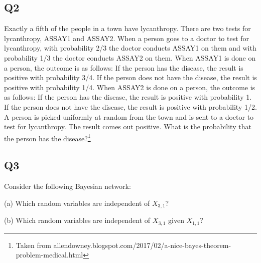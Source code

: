 \documentclass[11pt,a4paper]{scrartcl}
\begin{document}
\subsection*{Q2}
Exactly a fifth of the people in a town have lycanthropy. There
  are two tests for lycanthropy, ASSAY1 and ASSAY2. When a person goes
  to a doctor to test for lycanthropy, with probability 2/3 the doctor
  conducts ASSAY1 on them and with probability 1/3 the doctor conducts
  ASSAY2 on them. When ASSAY1 is done on a person, the outcome is as
  follows: If the person has the disease, the result is positive with
  probability 3/4. If the person does not have the disease, the result
  is positive with probability 1/4. When ASSAY2 is done on a person,
  the outcome is as follows: If the person has the disease, the result
  is positive with probability 1. If the person does not have the
  disease, the result is positive with probability 1/2. A person is
  picked uniformly at random from the town and is sent to a doctor to
  test for lycanthropy. The result comes out positive. What is the
  probability that the person has the disease?\footnote{Taken from
  allendowney.blogspot.com/2017/02/a-nice-bayes-theorem-problem-medical.html}

\subsection*{Q3}
Consider the following Bayesian network:

\begin{center}
\end{center}

(a) Which random variables are independent of $X_{3,1}$?

(b) Which random variables are independent of $X_{3,1}$ given $X_{1,1}$?
\end{document}
